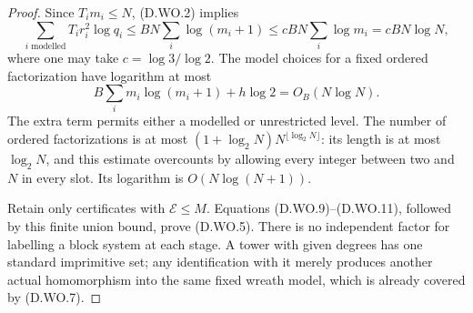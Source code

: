 \begin{proof}
Since $T_i m_i\le N$, (D.WO.2) implies
\[
 \sum_{i\text{ modelled}}T_i r_i^2\log q_i
 \le BN\sum_i\log(m_i+1)
 \le cB N\sum_i\log m_i
       =cB N\log N,                                    \tag{D.WO.10}
\]
where one may take $c=\log 3/\log 2$.
The model choices for a fixed ordered factorization have
logarithm at most
\[
       B\sum_i m_i\log(m_i+1)+h\log2
                                      =O_B(N\log N).    \tag{D.WO.11}
\]
The extra term permits either a modelled or unrestricted
level. The number of ordered factorizations is at most
$(1+\log_2N)N^{\lfloor\log_2N\rfloor}$: its length is
at most $\log_2N$, and this estimate overcounts by allowing
every integer between two and $N$ in every slot.
Its logarithm is $O(N\log(N+1))$.

Retain only certificates with $\mathcal E\le M$.
Equations (D.WO.9)--(D.WO.11), followed by this finite
union bound, prove (D.WO.5). There is no independent
factor for labelling a block system at each stage.
A tower with given degrees has one standard imprimitive
set; any identification with it merely produces another
actual homomorphism into the same fixed wreath model,
which is already covered by (D.WO.7).
\end{proof}

